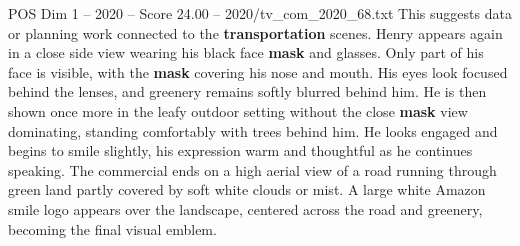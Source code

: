 \begin{textsample}{POS Dim 1 – 2020 – Score 24.00 – 2020/tv\_com\_2020\_68.txt}
This suggests data or planning work connected to the \textbf{transportation} scenes.
Henry appears again in a close side view wearing his black face \textbf{mask} and glasses.
Only part of his face is visible, with the \textbf{mask} covering his nose and mouth.
His eyes look focused behind the lenses, and greenery remains softly blurred behind him.
He is then shown once more in the leafy outdoor setting without the close \textbf{mask} view dominating, standing comfortably with trees behind him.
He looks engaged and begins to smile slightly, his expression warm and thoughtful as he continues speaking.
The commercial ends on a high aerial view of a road running through green land partly covered by soft white clouds or mist.
A large white Amazon smile logo appears over the landscape, centered across the road and greenery, becoming the final visual emblem.

\end{textsample}
